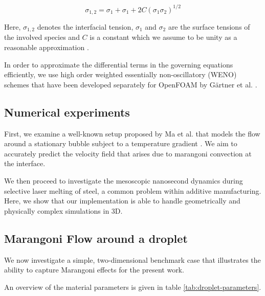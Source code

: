 \documentclass[conference,final]{IEEEtran}
\begin{document}
\begin{equation}
    \sigma_{1,2} = \sigma_1 + \sigma_1 + 2C (\sigma_1 \sigma_2)^{1/2}
\end{equation}

Here, $\sigma_{1,2}$ denotes the interfacial tension, $\sigma_1$ and $\sigma_2$ are the surface tensions of the involved species and $C$ is a constant which we assume to be unity as a reasonable approximation \cite{marmurCorrelatingInterfacialTensions2010}.

In order to approximate the differential terms in the governing equations efficiently, we use high order weighted essentially non-oscillatory (WENO) schemes that have been developed separately for OpenFOAM by Gärtner et al. \cite{gartnerEfficientWENOLibrary2020,martinImplementationValidationSemiImplicit2018}.

\subsection{Numerical experiments}

First, we examine a well-known setup proposed by Ma et al. that models the flow around a stationary bubble subject to a temperature gradient \cite{maDirectNumericalSimulation2011}. We aim to accurately predict the velocity field that arises due to marangoni convection at the interface.

We then proceed to investigate the mesoscopic nanosecond dynamics during selective laser melting of steel, a common problem within additive manufacturing. Here, we show that our implementation is able to handle geometrically and physically complex simulations in 3D.


\subsection{Marangoni Flow around a droplet}

We now investigate a simple, two-dimensional benchmark case that illustrates the ability to capture Marangoni effects for the present work.

An overview of the material parameters is given in table \ref{tab:droplet-parameters}.
\end{document}
